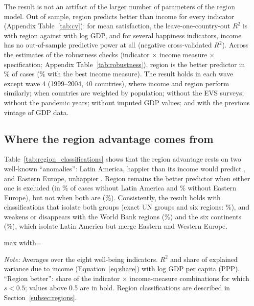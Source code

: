 \documentclass[12pt]{article}
\begin{document}
The result is not an artifact of the larger number of parameters of the region model. Out of sample, region predicts better than income for every indicator (Appendix Table~\ref{tab:cv}): for mean satisfaction, the leave-one-country-out $R^2$ is \cvRegionSatisfiedMean with region against \cvIncomeSatisfiedMean with log GDP, and for several happiness indicators, income has no out-of-sample predictive power at all (negative cross-validated $R^2$). Across the \nSpecsWVS estimates of the robustness checks (indicator $\times$ income measure $\times$ specification; Appendix Table~\ref{tab:robustness}), region is the better predictor in \shareRegionBetterWVS\% of cases (\shareRegionBetterWVSbest\% with the best income measure). The result holds in each wave except wave 4 (1999--2004, 40 countries), where income and region perform similarly; when countries are weighted by population; without the EVS surveys; without the pandemic years; without imputed GDP values; and with the previous vintage of GDP data.

\subsection{Where the region advantage comes from}\label{subsec:region_limits}

Table~\ref{tab:region_classifications} shows that the region advantage rests on two well-known ``anomalies'': Latin America, happier than its income would predict \citep{graham_paradox_2009,rojas_handbook_2016}, and Eastern Europe, unhappier \citep{guriev_unhappiness_2009}. Region remains the better predictor when either one is excluded (in \shareRegionBetterNoLatam\% of cases without Latin America and \shareRegionBetterNoEE\% without Eastern Europe), but not when both are (\shareRegionBetterNoLatamEE\%). Consistently, the result holds with classifications that isolate both groups (exact UN groups and six regions: \shareRegionBetterUN\%), and weakens or disappears with the World Bank regions (\shareRegionBetterWB\%) and the six continents (\shareRegionBetterContinents\%), which isolate Latin America but merge Eastern and Western Europe.

\begin{table}[htbp]
    \centering
    \caption{Income vs.\ region by region classification and without Latin America or Eastern Europe (WVS/EVS).}\label{tab:region_classifications}
    \begin{adjustbox}{max width=\textwidth}
    
    \end{adjustbox}
    \begin{minipage}{\textwidth}\footnotesize \textit{Note:} Averages over the eight well-being indicators. $R^2$ and share of explained variance due to income (Equation~\eqref{eq:share}) with log GDP per capita (PPP). ``Region better'': share of the indicator $\times$ income-measure combinations for which $s < 0.5$; values above 0.5 are in bold. Region classifications are described in Section~\ref{subsec:regions}.\end{minipage}
\end{table}
\end{document}
